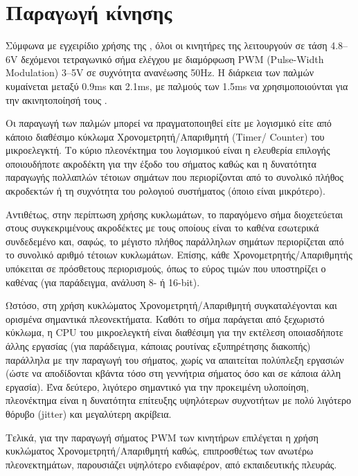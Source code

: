 \section{Παραγωγή κίνησης}
\label{sec:motor:motion}

Σύμφωνα με εγχειρίδιο χρήσης της \textcite{hitec02}, όλοι οι κινητήρες της
λειτουργούν σε τάση 4.8--6V δεχόμενοι τετραγωνικό σήμα ελέγχου με διαμόρφωση
PWM (\textenglish{Pulse-Width Modulation}) 3--5V σε συχνότητα ανανέωσης 50Hz.
Η διάρκεια των παλμών κυμαίνεται μεταξύ 0.9ms και 2.1ms, με παλμούς των 1.5ms να
χρησιμοποιούνται για την ακινητοποίησή τους \parencite{hitec02}.

Οι παραγωγή των παλμών μπορεί να πραγματοποιηθεί είτε με λογισμικό είτε από
κάποιο διαθέσιμο κύκλωμα Χρονομετρητή\slash Απαριθμητή (\textenglish{Timer\slash
Counter}) του μικροελεγκτή. Το κύριο πλεονέκτημα του λογισμικού είναι η
ελευθερία επιλογής οποιουδήποτε ακροδέκτη για την έξοδο του σήματος καθώς και η
δυνατότητα παραγωγής πολλαπλών τέτοιων σημάτων που περιορίζονται από το συνολικό
πλήθος ακροδεκτών ή τη συχνότητα του ρολογιού συστήματος (όποιο είναι
μικρότερο).

Αντιθέτως, στην περίπτωση χρήσης κυκλωμάτων, το παραγόμενο σήμα διοχετεύεται
στους συγκεκριμένους ακροδέκτες με τους οποίους είναι το καθένα εσωτερικά
συνδεδεμένο και, σαφώς, το μέγιστο πλήθος παράλληλων σημάτων περιορίζεται από το
συνολικό αριθμό τέτοιων κυκλωμάτων. Επίσης, κάθε Χρονομετρητής\slash Απαριθμητής
υπόκειται σε πρόσθετους περιορισμούς, όπως το εύρος τιμών που υποστηρίζει ο
καθένας (για παράδειγμα, ανάλυση 8- ή 16-bit).

Ωστόσο, στη χρήση κυκλώματος Χρονομετρητή\slash Απαριθμητή συγκαταλέγονται και
ορισμένα σημαντικά πλεονεκτήματα.
Καθότι το σήμα παράγεται από ξεχωριστό κύκλωμα, η CPU του μικροελεγκτή είναι
διαθέσιμη για την εκτέλεση οποιασδήποτε άλλης εργασίας (για παράδειγμα, κάποιας
ρουτίνας εξυπηρέτησης διακοπής) παράλληλα με την παραγωγή του σήματος, χωρίς να
απαιτείται πολύπλεξη εργασιών (ώστε να αποδίδονται κβάντα τόσο στη γεννήτρια
σήματος όσο και σε κάποια άλλη εργασία). Ένα δεύτερο, λιγότερο σημαντικό για την
προκειμένη υλοποίηση, πλεονέκτημα είναι η δυνατότητα επίτευξης υψηλότερων
συχνοτήτων με πολύ λιγότερο θόρυβο (\textenglish{jitter}) και μεγαλύτερη
ακρίβεια.

Τελικά, για την παραγωγή σήματος PWM των κινητήρων επιλέγεται η χρήση κυκλώματος
Χρονομετρητή\slash Απαριθμητή καθώς, επιπροσθέτως των ανωτέρω πλεονεκτημάτων,
παρουσιάζει υψηλότερο ενδιαφέρον, από εκπαιδευτικής πλευράς.


